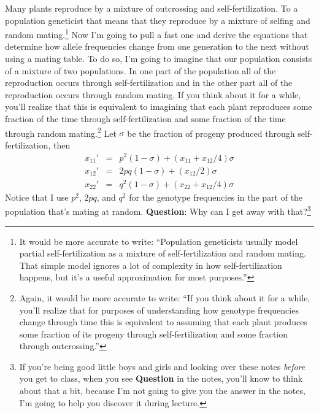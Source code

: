 Many plants reproduce by a mixture of outcrossing and
self-fertilization. To a
population geneticist that means that they reproduce by a mixture of
selfing and random mating.\footnote{It would be more accurate to
  write: ``Population geneticists usually model partial
  self-fertilization as a mixture of self-fertilization and random
  mating. That simple model ignores a lot of complexity in how
  self-fertilization happens, but it's a useful approximation for most
  purposes.''} Now I'm going to pull a fast one and derive the
equations that determine how allele frequencies change from one
generation to the next without using a mating table. To do so, I'm
going to imagine that our population consists of a mixture of two
populations. In one part of the population all of the reproduction
occurs through self-fertilization and in the other part all of the
reproduction occurs through random mating. If you think about it for a
while, you'll realize that this is equivalent to imagining that each
plant reproduces some fraction of the time through self-fertilization
and some fraction of the time through random mating.\footnote{Again,
  it would be more accurate to write: ``If you think about it for a
  while, you'll realize that for purposes of understanding how
  genotype frequencies change through time this is equivalent to
  assuming that each plant produces some fraction of its progeny
  through self-fertilization and some fraction through outcrossing.''}
Let $\sigma$ be the fraction of progeny produced through
self-fertilization, then
\begin{eqnarray}
x_{11}' &=& p^2(1-\sigma) + (x_{11} + x_{12}/4)\sigma \\
x_{12}' &=& 2pq(1-\sigma) + (x_{12}/2)\sigma  \label{eq:het} \\
x_{22}' &=& q^2(1-\sigma) + (x_{22} + x_{12}/4)\sigma
\end{eqnarray}
Notice that I use $p^2$, $2pq$, and $q^2$ for the genotype frequencies
in the part of the population that's mating at random. {\bf Question}:
Why can I get away with that?\footnote{If you're being good little
  boys and girls and looking over these notes {\it before\/} you get
  to class, when you see {\bf Question} in the notes, you'll know to
  think about that a bit, because I'm not going to give you the answer
  in the notes, I'm going to help you discover it during lecture.}

